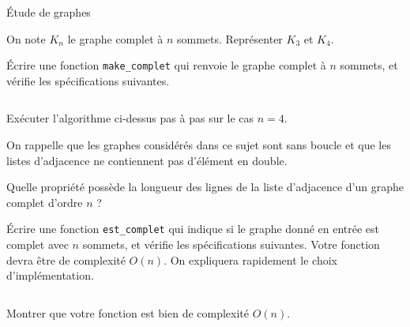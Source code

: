 \begin{exo}[PC][1][devoir]{Étude de graphes}
\begin{quest}
\item On note $K_n$ le graphe complet à $n$ sommets. Représenter $K_3$ et $K_4$.
\item Écrire une fonction \texttt{make\_complet} qui renvoie le graphe complet à $n$ sommets, et vérifie les spécifications suivantes.
\inputminted{python}{\pathtoexos/Info/Scripts/make_complet.py}
\item Exécuter l'algorithme ci-dessus pas à pas sur le cas $n=4$.
\end{quest}
On rappelle que les graphes considérés dans ce sujet sont sans boucle et que les listes d’adjacence ne
contiennent pas d’élément en double.
\begin{quest}
\item Quelle propriété possède la longueur des lignes de la liste d’adjacence d’un graphe complet d'ordre $n$ ?
\item Écrire une fonction \texttt{est\_complet} qui indique si le graphe donné en entrée est complet avec $n$ sommets, et vérifie les spécifications suivantes. Votre fonction devra être de complexité $O(n)$. On expliquera
rapidement le choix d’implémentation.
\inputminted{python}{\pathtoexos/Info/Scripts/est_complet.py}
\item Montrer que votre fonction est bien de complexité $O(n)$.
\end{quest}

\end{exo}



